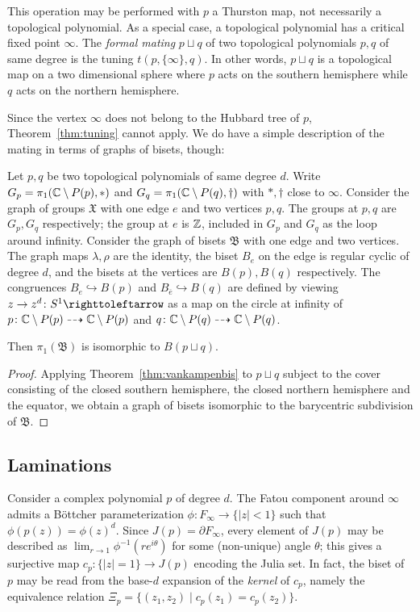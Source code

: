 \documentclass{amsart}
\begin{document}
This operation may be performed with $p$ a Thurston map, not necessarily a
topological polynomial. As a special case, a topological polynomial has a
critical fixed point $\infty$. The \emph{formal mating} $p\sqcup q$ of two
topological polynomials $p,q$ of same degree is the tuning $t(p,\{\infty\},
q)$. In other words, $p\sqcup q$ is a topological map on a two dimensional
sphere where $p$ acts on the southern hemisphere while $ q$ acts on the
northern hemisphere.

Since the vertex $\infty$ does not belong to the Hubbard tree of $p$,
Theorem~\ref{thm:tuning} cannot apply. We do have a simple description of
the mating in terms of graphs of bisets, though:

\begin{thm}\label{thm:mating}
  Let $p,q$ be two topological polynomials of same degree $d$. Write
  $G_p=\pi_1({\mathbb C}\setminus P(p),*)$ and $G_{ q}=\pi_1({\mathbb C}\setminus P(
  q),\dagger)$ with $*,\dagger$ close to $\infty$. Consider the graph of
  groups $\mathfrak X$ with one edge $e$ and two vertices $p, q$. The
  groups at $p, q$ are $G_p,G_{ q}$ respectively; the group at $e$ is ${\mathbb Z}$,
  included in $G_p$ and $G_{ q}$ as the loop around infinity. Consider the
  graph of bisets $\mathfrak B$ with one edge and two vertices. The graph
  maps $\lambda,\rho$ are the identity, the biset $B_e$ on the edge is regular cyclic of degree $d$, and the bisets at the vertices are $B(p),B( q)$
  respectively. The congruences $ B_e\hookrightarrow B(p)$ and $
  B_{\overline e}\hookrightarrow B({ q})$ are defined by viewing $z\to
  z^d\colon S^1\righttoleftarrow$ as a map on the circle at infinity of
  $p\colon {\mathbb C}\setminus P(p)\dashrightarrow {\mathbb C}\setminus P(p) $ and $q\colon
  {\mathbb C}\setminus P(q)\dashrightarrow {\mathbb C}\setminus P(q)$.
  
  Then $\pi_1(\mathfrak B)$ is isomorphic to $B(p\sqcup q)$.
\end{thm}
\begin{proof}
  Applying Theorem~\ref{thm:vankampenbis} to $p\sqcup q$ subject to the
  cover consisting of the closed southern hemisphere, the closed northern
  hemisphere and the equator, we obtain a graph of bisets isomorphic to the
  barycentric subdivision of $\mathfrak B$.
\end{proof}

\subsection{Laminations}\label{ss:laminations}
Consider a complex polynomial $p$ of degree $d$. The Fatou component
around $\infty$ admits a B\"ottcher parameterization
$\phi\colon F_\infty\to\{|z|<1\}$ such that
$\phi(p(z))=\phi(z)^d$. Since $J(p)=\partial F_\infty$, every element
of $J(p)$ may be described as $\lim_{r\to1}\phi^{-1}(re^{i\theta})$
for some (non-unique) angle $\theta$; this gives a surjective map
$c_p\colon \{|z|=1\}\to J(p)$ encoding the Julia set. In fact, the
biset of $p$ may be read from the base-$d$ expansion of the
\emph{kernel} of $c_p$, namely the equivalence relation
$\Xi_p=\{(z_1,z_2)\mid c_p(z_1)=c_p(z_2)\}$.
\end{document}
